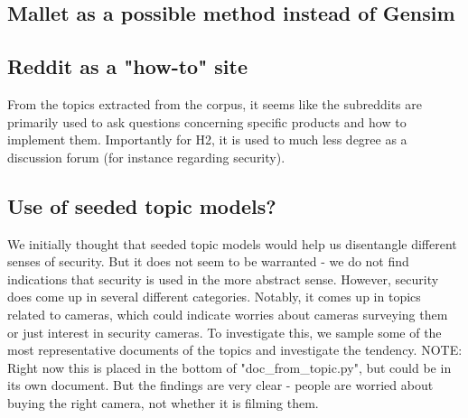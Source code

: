 \documentclass{article}
\begin{document}
    \subsection{Mallet as a possible method instead of Gensim}
    \subsection{Reddit as a "how-to" site}
        From the topics extracted from the corpus, it seems like the subreddits are primarily used to ask questions concerning specific products and how to implement them. Importantly for H2, it is used to much less degree as a discussion forum (for instance regarding security).
    \subsection{Use of seeded topic models?}
        We initially thought that seeded topic models would help us disentangle different senses of security. But it does not seem to be warranted - we do not find indications that security is used in the more abstract sense. However, security does come up in several different categories. Notably, it comes up in topics related to cameras, which could indicate worries about cameras surveying them or just interest in security cameras. To investigate this, we sample some of the most representative documents of the topics and investigate the tendency. NOTE: Right now this is placed in the bottom of "doc\_from\_topic.py", but could be in its own document. But the findings are very clear - people are worried about buying the right camera, not whether it is filming them. 
\end{document}
